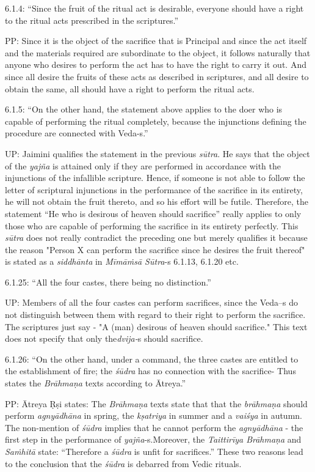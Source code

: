 6.1.4: “Since the fruit of the ritual act is desirable, everyone should have a right to the ritual acts prescribed in the scriptures.”

PP: Since it is the object of the sacrifice that is Principal and since the act itself and the materials required are subordinate to the object, it follows naturally that anyone who desires to perform the act has to have the right to carry it out. And since all desire the fruits of these acts as described in scriptures, and all desire to obtain the same, all should have a right to perform the ritual acts.

6.1.5: “On the other hand, the statement above applies to the doer who is capable of performing the ritual completely, because the injunctions defining the procedure are connected with Veda-s.”

UP: Jaimini qualifies the statement in the previous \textit{sūtra}. He says that the object of the \textit{yajña} is attained only if they are performed in accordance with the injunctions of the infallible scripture. Hence, if someone is not able to follow the letter of scriptural injunctions in the performance of the sacrifice in its entirety, he will not obtain the fruit thereto, and so his effort will be futile. Therefore, the statement “He who is desirous of heaven should sacrifice” really applies to only those who are capable of performing the sacrifice in its entirety perfectly. This \textit{sūtra} does not really contradict the preceding one but merely qualifies it because the reason "Person X can perform the sacrifice since he desires the fruit thereof" is stated as a \textit{siddhānta} in \textit{Mīmāṁsā Sūtra}-s 6.1.13, 6.1.20 etc.

6.1.25: “All the four castes, there being no distinction.”

UP: Members of all the four castes can perform sacrifices, since the Veda--s do not distinguish between them with regard to their right to perform the sacrifice. The scriptures just say - "A (man) desirous of heaven should sacrifice." This text does not specify that only the\break \textit{dvija-}s should sacrifice.

6.1.26: “On the other hand, under a command, the three castes are entitled to the establishment of fire; the \textit{śūdra} has no connection with the sacrifice- Thus states the \textit{Brāhmaṇa} texts according to Ātreya.”

PP: Ātreya Ṛṣi states: The \textit{Brāhmaṇa} texts state that that the \textit{brāhmaṇa} should perform \textit{agnyādhāna} in spring, the \textit{kṣatriya} in summer and a \textit{vaiśya} in autumn. The non-mention of \textit{śūdra} implies that he cannot perform the \textit{agnyādhāna} - the first step in the performance of \textit{yajña}-s.\break Moreover, the \textit{Taittirīya Brāhmaṇa} and \textit{Saṁhitā} state: “Therefore a \textit{śūdra} is unfit for sacrifices.” These two reasons lead to the conclusion that the \textit{śūdra} is debarred from Vedic rituals.

